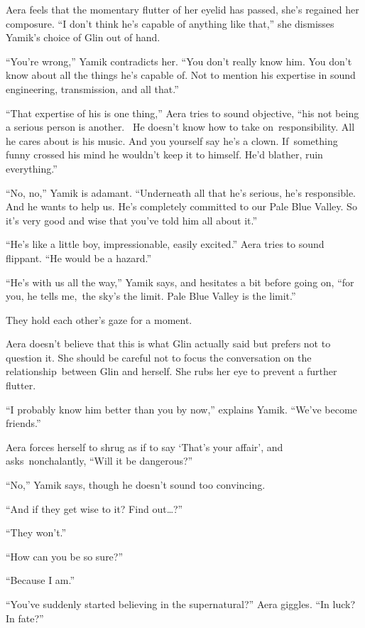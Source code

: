 \documentclass[twoside,11pt]{book}
\begin{document}
Aera feels that the momentary flutter of her eyelid has passed, she's regained her composure. ``I don't
think he's capable of anything like that,'' she dismisses Yamik's choice of Glin out of hand. ~

``You're wrong,'' Yamik contradicts her. ``You don't really know him. You don't
know about all the things he's capable of. Not to mention his expertise in sound engineering, transmission, and all
that.''

``That expertise of his is one thing,'' Aera tries to sound objective, ``his not
being a serious person is another. \ He doesn't know how to take on~responsibility. All he cares about is his music.
And you yourself say he's a clown. If~something funny crossed his mind he wouldn't keep it to himself. He'd blather,
ruin everything.''

``No, no,'' Yamik is adamant. ``Underneath all that he's serious, he's
responsible. And he wants to help us. He's completely committed to our Pale Blue Valley. So it's very good and wise
that you've told him all about it.''

``He's like a little boy, impressionable, easily excited.'' Aera tries to sound flippant.
``He would be a hazard.''

``He's with us all the way,'' Yamik says, and hesitates a bit before going on,{
}``for you, he tells me,~the sky's the limit. Pale Blue Valley is the limit.''

They hold each other's gaze for a moment.

Aera doesn't believe that this is what Glin actually said but prefers not to question it. She should be careful not to
focus the conversation on the relationship~between Glin and herself. She rubs her eye to prevent a further flutter.

``I probably know him better than you by now,'' explains Yamik. ``We've become
friends.''

Aera forces herself to shrug as if to say `That's your affair', and asks~nonchalantly, ``Will it be
dangerous?''

``No,'' Yamik says, though he doesn't sound too convincing.

``And if they get wise{ }to it? Find out{\dots}?''

``They won't.'' \

``How can you be so sure?''

``Because I am.''

``You've suddenly started believing in the supernatural?'' Aera giggles. ``In
luck? In fate?''
\end{document}
